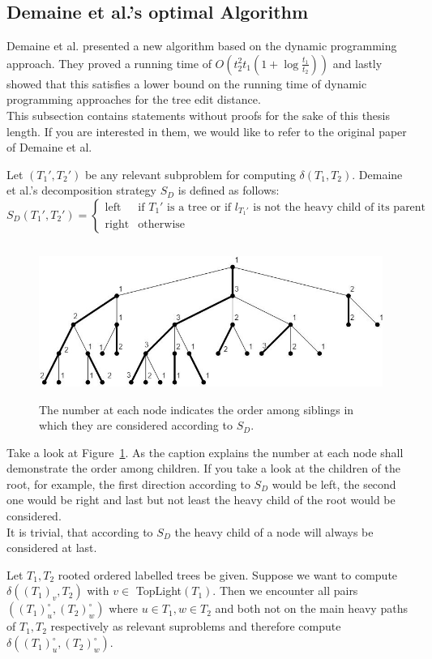 \subsection{Demaine et al.'s optimal Algorithm}
Demaine et al. presented a new algorithm based on the dynamic programming approach. They proved a running time of $O(t_2^2t_1(1+\log \frac{t_1}{t_2}))$ and lastly showed that this satisfies a lower bound on the running time of dynamic programming approaches for the tree edit distance.\\
This subsection contains statements without proofs for the sake of this thesis length. If you are interested in them, we would like to refer to the original paper of Demaine et al.~\cite{Dem}
\begin{defin}
Let $(T_1',T_2')$ be any relevant subproblem for computing $\delta(T_1,T_2)$. Demaine et al.'s decomposition strategy $S_D$ is defined as follows:\\
$$ S_D(T_1',T_2') = 
\begin{cases}
\text{left} & \text{if }T_1' \text{ is a tree or if }l_{T_1'} \text{ is not the heavy child of its parent} \\
\text{right} & \text{otherwise} 
\end{cases}$$
\end{defin}
\begin{figure}\label{fig:S_D}
	\includegraphics[height=5cm]{figures/optimal_algorithm.jpg}
	\caption{The number at each node indicates the order among siblings in which they are considered according to $S_D$.}
\end{figure}
\begin{rem}
Take a look at Figure~\ref{fig:S_D}. As the caption explains the number at each node shall demonstrate the order among children. If you take a look at the children of the root, for example, the first direction according to $S_D$ would be left, the second one would be right and last but not least the heavy child of the root would be considered.\\
It is trivial, that according to $S_D$ the heavy child of a node will always be considered at last.
\end{rem}
\begin{lem}
Let $T_1,T_2$ rooted ordered labelled trees be given. Suppose we want to compute $\delta((T_1)_v,T_2)$ with $v \in$ TopLight$(T_1)$. Then we encounter all pairs $((T_1)_u^{\circ}, (T_2)_w^{\circ})$ where $u \in T_1, w \in T_2$ and both not on the main heavy paths of $T_1, T_2$ respectively as relevant suproblems and therefore compute $\delta((T_1)_u^{\circ}, (T_2)_w^{\circ}).$ 
\end{lem}


